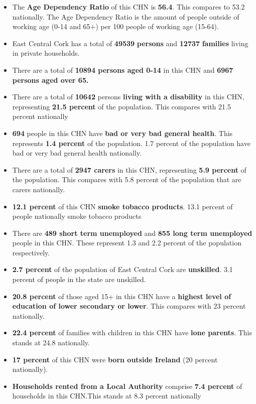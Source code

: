 \documentclass{article}
\begin{document}
\begin{itemize}

\item The \textbf{Age Dependency Ratio} of this CHN is  \textbf{56.4}. This compares to 53.2 nationally. The Age Dependency Ratio is the amount of people outside of working age (0-14 and 65+) per 100 people of working age (15-64). 

\item East Central Cork has a total of \textbf{\num{49539}} \textbf{persons} and  \textbf{\num{12737}} \textbf{families} living in private households.

\item There are a total of \textbf{\num{10894} persons aged 0-14} in this CHN and \textbf{\num{6967} persons aged over 65.} 

\item There are a total of \textbf{\num{10642}} persons \textbf{living with a disability} in this CHN, representing \textbf{21.5 percent} of the population. This compares with  21.5 percent nationally

\item \textbf{\num{694}} people in this CHN have \textbf{bad or very bad general health}. This represents \textbf{1.4 percent} of the population. 1.7 percent of the population have bad or very bad general health nationally. 

\item There are a total of \textbf{\num{2947} carers} in this CHN, representing \textbf{5.9 percent} of the population. This compares with 5.8 percent of the population that are carers nationally. 

\item \textbf{12.1 percent} of this CHN \textbf{smoke tobacco products}. 13.1 percent of people nationally smoke tobacco products

\item There are \textbf{\num{489} short term unemployed} and \textbf{\num{855} long term unemployed} people in this CHN. These represent 1.3 and 2.2 percent of the population respectively.

\item  \textbf{2.7 percent} of the population of East Central Cork are \textbf{unskilled}. 3.1 percent of people in the state are unskilled.

\item \textbf{20.8 percent} of those aged 15+ in this CHN have a \textbf{highest level of education of lower secondary or lower}. This compares with 23 percent nationally. 

\item \textbf{22.4 percent} of families with children in this CHN have \textbf{lone parents}. This stands at 24.8 nationally.

\item \textbf{17 percent} of this CHN were \textbf{born outside Ireland} (20 percent nationally).

\item \textbf{Households rented from a Local Authority} comprise \textbf{7.4 percent} of households in this CHN.This stands at 8.3 percent nationally

\end{itemize}
\end{document}
